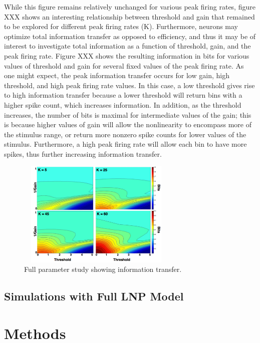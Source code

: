 \documentclass[12pt]{article}
\begin{document}
While this figure remains relatively unchanged for various peak firing rates, figure XXX shows an interesting relationship between threshold and gain that remained to be explored for different peak firing rates (K). Furthermore, neurons may optimize total information transfer as opposed to efficiency, and thus it may be of interest to investigate total information as a function of threshold, gain, and the peak firing rate. Figure XXX shows the resulting information in bits for various values of threshold and gain for several fixed values of the peak firing rate. As one might expect, the peak information transfer occurs for low gain, high threshold, and high peak firing rate values. In this case, a low threshold gives rise to high information transfer because a lower threshold will return bins with a higher spike count, which increases information. In addition, as the threshold increases, the number of bits is maximal for intermediate values of the gain; this is because higher values of gain will allow the nonlinearity to encompass more of the stimulus range, or return more nonzero spike counts for lower values of the stimulus. Furthermore, a high peak firing rate will allow each bin to have more spikes, thus further increasing information transfer. 

\begin{figure}[h!!]
\centerline{\includegraphics*[height = 2.0in,width=3.0in,angle=0]{InfoPeakFR.pdf}}
\label{Figure 4}
\caption{Full parameter study showing information transfer.}
\end{figure}

\subsection{Simulations with Full LNP Model}

\section{Methods}
\end{document}

